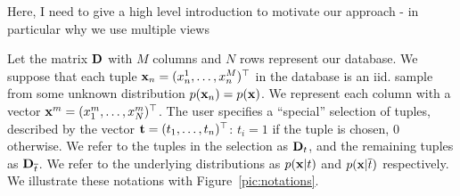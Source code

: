 {\color{red} Here, I need to give a high level introduction to motivate our
approach - in particular why we use multiple views}

Let the matrix $\mathbf{D}$ with $M$ columns and $N$ rows represent our database.
We suppose that each tuple $\mathbf{x}_n = (x^1_n, \dots, x^M_n)^\top$ in the
database is an iid. sample from some unknown distribution
$p(\mathbf{x}_n)=p(\mathbf{x})$. We represent each column with a vector $\mathbf{x}^{m}=
(x^m_1, \dots, x^m_N)^\top$.  The user specifies a ``special'' selection of
tuples, described by the vector $\mathbf{t} = (t_1, \ldots, t_n)^\top$: $t_i=1$ if
the tuple is chosen, 0 otherwise. We refer to the tuples in the selection as
${\mathbf{D}}_t$, and the remaining tuples as ${\mathbf{D}}_{\overline{t}}$. We refer
to the underlying distributions as $p(\mathbf{x}|t)$ and $p(\mathbf{x}|\overline{t})$
respectively. We illustrate these notations with Figure~\ref{pic:notations}.

